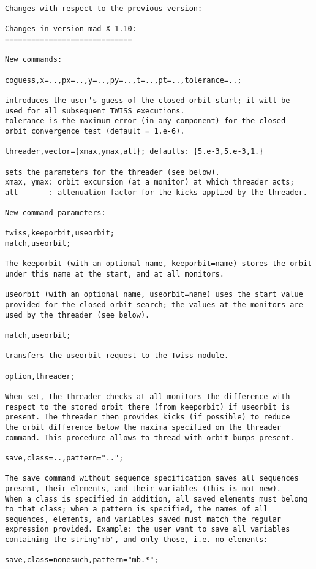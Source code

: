 \begin{verbatim}
Changes with respect to the previous version:

Changes in version mad-X 1.10:
=============================

New commands:

coguess,x=..,px=..,y=..,py=..,t=..,pt=..,tolerance=..;

introduces the user's guess of the closed orbit start; it will be
used for all subsequent TWISS executions.
tolerance is the maximum error (in any component) for the closed
orbit convergence test (default = 1.e-6).

threader,vector={xmax,ymax,att}; defaults: {5.e-3,5.e-3,1.}

sets the parameters for the threader (see below).
xmax, ymax: orbit excursion (at a monitor) at which threader acts;
att       : attenuation factor for the kicks applied by the threader.

New command parameters:

twiss,keeporbit,useorbit;
match,useorbit;

The keeporbit (with an optional name, keeporbit=name) stores the orbit
under this name at the start, and at all monitors.

useorbit (with an optional name, useorbit=name) uses the start value
provided for the closed orbit search; the values at the monitors are
used by the threader (see below).

match,useorbit;

transfers the useorbit request to the Twiss module.

option,threader;

When set, the threader checks at all monitors the difference with
respect to the stored orbit there (from keeporbit) if useorbit is
present. The threader then provides kicks (if possible) to reduce
the orbit difference below the maxima specified on the threader
command. This procedure allows to thread with orbit bumps present.

save,class=..,pattern="..";

The save command without sequence specification saves all sequences
present, their elements, and their variables (this is not new).
When a class is specified in addition, all saved elements must belong
to that class; when a pattern is specified, the names of all
sequences, elements, and variables saved must match the regular
expression provided. Example: the user want to save all variables
containing the string"mb", and only those, i.e. no elements:

save,class=nonesuch,pattern="mb.*";


\end{verbatim}
